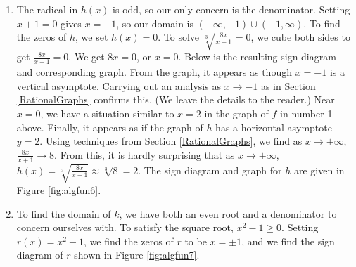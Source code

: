 {\begin{enumerate}
\item  The radical in $h(x)$ is odd, so our only concern is the denominator.  Setting $x+1=0$ gives $x=-1$, so our domain is $(-\infty, -1) \cup (-1, \infty)$.  To find the zeros of $h$, we set $h(x) = 0$. 
To solve $\sqrt[3]{\frac{8x}{x+1}} = 0$, we cube both sides to get $\frac{8x}{x+1} = 0$.  We get $8x=0$, or $x=0$. Below is the resulting sign diagram and corresponding graph. From the graph, it appears as though $x=-1$ is a vertical asymptote.  Carrying out an analysis as $x \rightarrow -1$ as in Section \ref{RationalGraphs} confirms this.  (We leave the details to the reader.)  Near $x=0$, we have a situation similar to $x=2$ in the graph of $f$ in number 1 above.  Finally, it appears as if the graph of $h$ has a horizontal asymptote $y=2$.  Using techniques from Section \ref{RationalGraphs}, we find as $x \rightarrow \pm \infty$, $\frac{8x}{x+1} \rightarrow 8$.  From this, it is hardly surprising that as $x \rightarrow \pm \infty$, $h(x) = \sqrt[3]{\frac{8x}{x+1}} \approx  \sqrt[3]{8} =2$. The sign diagram and graph for $h$ are given in Figure \ref{fig:algfun6}.



\item  To find the domain of $k$, we have both an even root and a denominator to concern ourselves with.  To satisfy the square root, $x^2 - 1 \geq 0$.  Setting $r(x) = x^2-1$, we find the zeros of $r$ to be $x = \pm 1$, and we find the sign diagram of $r$ shown in Figure \ref{fig:algfun7}.




\end{enumerate}}
